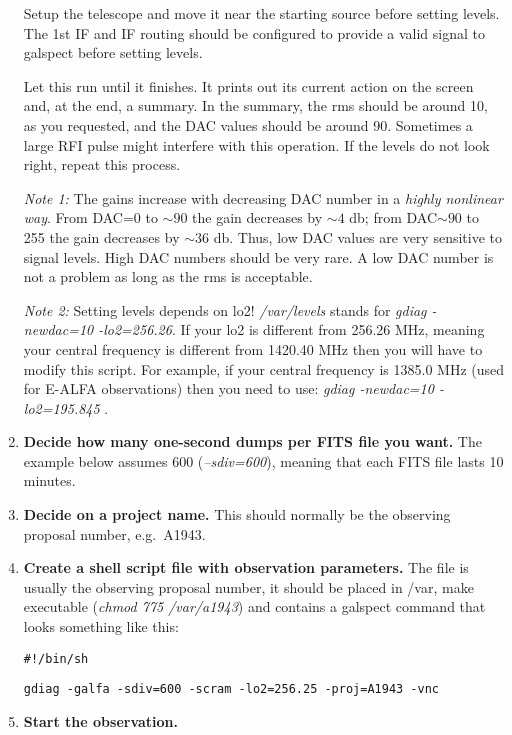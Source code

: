 \documentclass[psfig,preprint]{aastex}
\begin{document}
\begin{enumerate}
	Setup the telescope and move it near the starting source 
before setting levels.  The 1st IF and IF routing should be 
configured to provide a valid signal to galspect before setting
levels.

	Let this run until it finishes.  It prints out its current
action on the screen and, at the end, a summary.  In the summary, the
rms should be around 10, as you requested, and the DAC values should be
around 90.  Sometimes a large RFI pulse might interfere with this operation. 
If the levels do not look right, repeat this process.


{\it Note 1:} The gains increase with decreasing DAC number in a
{\it highly nonlinear way}.  From DAC=0 to $\sim 90$ the gain decreases
by $\sim 4$ db; from DAC$\sim 90$ to 255 the gain decreases by $\sim 36$
db.  Thus, low DAC values are very sensitive to signal levels.  High DAC
numbers should be very rare. A low DAC number is not a problem as long
as the rms is acceptable. 

{\it Note 2:} Setting levels depends on lo2! {\it /var/levels} stands for 
{\it gdiag -newdac=10 -lo2=256.26}.
If your lo2 is different from 256.26 MHz, meaning your central frequency
is different from 1420.40 MHz then you will have to modify this script.
For example, if your central frequency is 1385.0 MHz (used for E-ALFA
observations) then you need to use:
{\it gdiag -newdac=10 -lo2=195.845} .

	\item {\bf Decide how many one-second dumps per FITS file you want.}
The example below assumes 600 ({\it --sdiv=600}), meaning that each FITS 
file lasts 10 minutes.

	\item {\bf Decide on a project name.} This should normally be the
observing proposal number, e.g.\ A1943. 

	\item {\bf Create a shell script file with observation parameters.} 
The file is usually the observing proposal number, it should be 
placed in /var, make executable ({\it chmod 775 /var/a1943})  and contains a 
galspect command that looks something like this:

\vspace{.1in}


{\centerline{\tt  \#!/bin/sh }}
{\centerline{\tt  gdiag -galfa -sdiv=600 -scram -lo2=256.25 -proj=A1943 -vnc }}

	\item {\bf Start the observation.} 


\end{enumerate}
\end{document}

